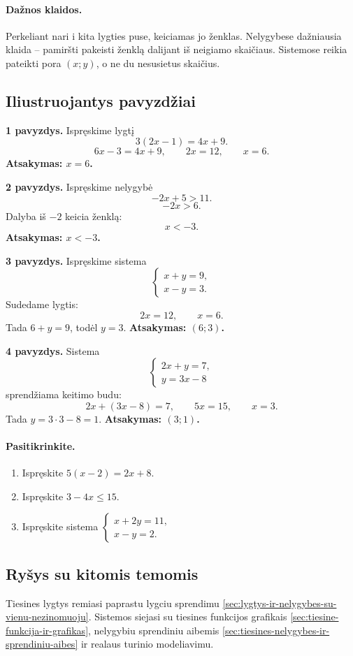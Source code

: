 \paragraph{Dažnos klaidos.}
Perkeliant nari i kita lygties puse, keiciamas jo ženklas. Nelygybese dažniausia klaida -- pamiršti pakeisti ženklą dalijant iš neigiamo skaičiaus. Sistemose reikia pateikti pora $(x;y)$, o ne du nesusietus skaičius.

\subsection{Iliustruojantys pavyzdžiai}
\textbf{1 pavyzdys.} Ispręskime lygtį
\[
3(2x-1)=4x+9.
\]
\[
6x-3=4x+9,\qquad 2x=12,\qquad x=6.
\]
\textbf{Atsakymas: $x=6$.}

\textbf{2 pavyzdys.} Ispręskime nelygybė
\[
-2x+5>11.
\]
\[
-2x>6.
\]
Dalyba iš $-2$ keicia ženklą:
\[
x<-3.
\]
\textbf{Atsakymas: $x<-3$.}

\textbf{3 pavyzdys.} Ispręskime sistema
\[
\begin{cases}
x+y=9,\\
x-y=3.
\end{cases}
\]
Sudedame lygtis:
\[
2x=12,\qquad x=6.
\]
Tada $6+y=9$, todėl $y=3$.
\textbf{Atsakymas: $(6;3)$.}

\textbf{4 pavyzdys.} Sistema
\[
\begin{cases}
2x+y=7,\\
y=3x-8
\end{cases}
\]
sprendžiama keitimo budu:
\[
2x+(3x-8)=7,\qquad 5x=15,\qquad x=3.
\]
Tada $y=3\cdot3-8=1$.
\textbf{Atsakymas: $(3;1)$.}

\paragraph{Pasitikrinkite.}
\begin{enumerate}[label=\alph*)]
\item Ispręskite $5(x-2)=2x+8$.
\item Ispręskite $3-4x\le 15$.
\item Ispręskite sistema $\begin{cases}x+2y=11,\\ x-y=2.\end{cases}$
\end{enumerate}

\subsection{Ryšys su kitomis temomis}
Tiesines lygtys remiasi paprastu lygciu sprendimu \ref{sec:lygtys-ir-nelygybes-su-vienu-nezinomuoju}. Sistemos siejasi su tiesines funkcijos grafikais \ref{sec:tiesine-funkcija-ir-grafikas}, nelygybiu sprendiniu aibemis \ref{sec:tiesines-nelygybes-ir-sprendiniu-aibes} ir realaus turinio modeliavimu.

